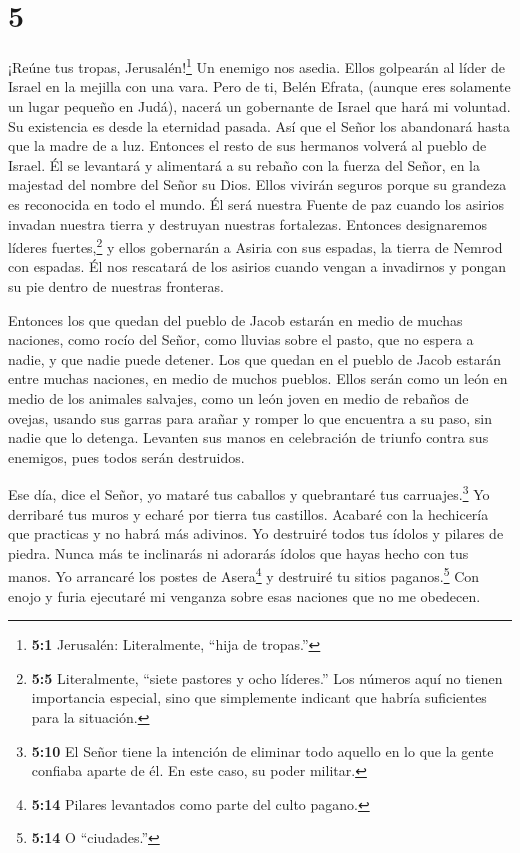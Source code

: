 \hypertarget{section-4}{%
\section{5}\label{section-4}}

 ¡Reúne tus tropas, Jerusalén!\footnote{\textbf{5:1}
  Jerusalén: Literalmente, ``hija de tropas.''} Un enemigo nos asedia.
Ellos golpearán al líder de Israel en la mejilla con una vara.
 Pero de ti, Belén Efrata, (aunque eres solamente un lugar
pequeño en Judá), nacerá un gobernante de Israel que hará mi voluntad.
Su existencia es desde la eternidad pasada.  Así que el
Señor los abandonará hasta que la madre de a luz. Entonces el resto de
sus hermanos volverá al pueblo de Israel.  Él se levantará y
alimentará a su rebaño con la fuerza del Señor, en la majestad del
nombre del Señor su Dios. Ellos vivirán seguros porque su grandeza es
reconocida en todo el mundo.  Él será nuestra Fuente de paz
cuando los asirios invadan nuestra tierra y destruyan nuestras
fortalezas. Entonces designaremos líderes fuertes,\footnote{\textbf{5:5}
  Literalmente, ``siete pastores y ocho líderes.'' Los números aquí no
  tienen importancia especial, sino que simplemente indicant que habría
  suficientes para la situación.}  y ellos gobernarán a
Asiria con sus espadas, la tierra de Nemrod con espadas. Él nos
rescatará de los asirios cuando vengan a invadirnos y pongan su pie
dentro de nuestras fronteras.

 Entonces los que quedan del pueblo de Jacob estarán en
medio de muchas naciones, como rocío del Señor, como lluvias sobre el
pasto, que no espera a nadie, y que nadie puede detener. 
Los que quedan en el pueblo de Jacob estarán entre muchas naciones, en
medio de muchos pueblos. Ellos serán como un león en medio de los
animales salvajes, como un león joven en medio de rebaños de ovejas,
usando sus garras para arañar y romper lo que encuentra a su paso, sin
nadie que lo detenga.  Levanten sus manos en celebración de
triunfo contra sus enemigos, pues todos serán destruidos.

 Ese día, dice el Señor, yo mataré tus caballos y
quebrantaré tus carruajes.\footnote{\textbf{5:10} El Señor tiene la
  intención de eliminar todo aquello en lo que la gente confiaba aparte
  de él. En este caso, su poder militar.}  Yo derribaré tus
muros y echaré por tierra tus castillos.  Acabaré con la
hechicería que practicas y no habrá más adivinos.  Yo
destruiré todos tus ídolos y pilares de piedra. Nunca más te inclinarás
ni adorarás ídolos que hayas hecho con tus manos.  Yo
arrancaré los postes de Asera\footnote{\textbf{5:14} Pilares levantados
  como parte del culto pagano.} y destruiré tu sitios
paganos.\footnote{\textbf{5:14} O ``ciudades.''}  Con enojo
y furia ejecutaré mi venganza sobre esas naciones que no me obedecen.

